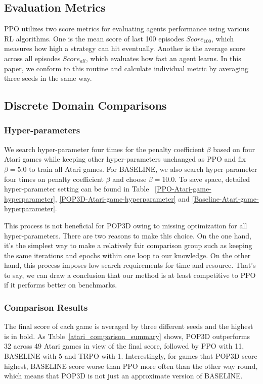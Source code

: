 \documentclass{article}
\begin{document}
\subsection{Evaluation Metrics}
PPO utilizes two score metrics for evaluating  agents performance using various RL algorithms. One is the mean score of last 100 episodes $Score_{100}$, which measures how high a strategy can hit eventually. Another is the average score across all episodes $Score_{all}$, which evaluates how fast an agent learns. In this paper, we  conform to this routine and calculate individual metric by averaging three seeds in the same way.

\subsection{Discrete Domain Comparisons}
\subsubsection{Hyper-parameters}
We search hyper-parameter four times for the penalty coefficient $\beta$ based on four Atari games while keeping other hyper-parameters unchanged as PPO and fix $\beta=5.0$ to train all Atari games. For BASELINE, we also search hyper-parameter four times on penalty coefficient $\beta$ and choose $\beta=10.0$. To save space, detailed hyper-parameter setting can be found in Table~ \ref{PPO-Atari-game-hyperparameter}, \ref{POP3D-Atari-game-hyperparameter} and  \ref{Baseline-Atari-game-hyperparameter}.

This process is not beneficial for POP3D owing to missing optimization for all hyper-parameters. There are two reasons to make this choice. On the one hand, it’s the simplest way to make a relatively fair comparison group such as keeping
the same iterations and epochs within one loop to our knowledge. On the other hand, this process imposes low search requirements for time and resource. That's to say,  we can draw a  conclusion that our method is at least competitive to PPO if it performs better on benchmarks.  

\subsubsection{Comparison Results}

The final score of  each game  is averaged by three different seeds and the highest is in bold. As Table~\ref{atari_comparison_summary} shows, POP3D outperforms 32 across 49 Atari games in view of the final score, followed by PPO with 11, BASELINE with 5 and TRPO with 1. Interestingly, for games that POP3D score highest, BASELINE score worse than PPO more often than the other way round, which means that POP3D is not just an approximate version of BASELINE.  
\end{document}
